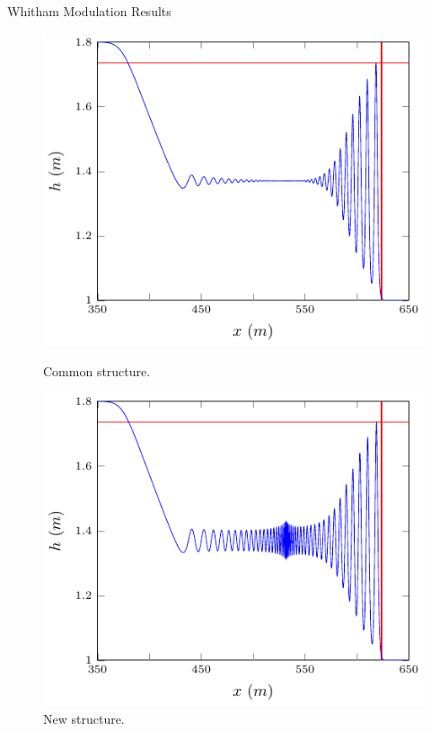 \documentclass[pdf]{beamer}
\begin{document}
\begin{frame}{Whitham Modulation Results}
		\begin{figure}
			\hspace*{-0.9cm}%
			\begin{minipage}{.5\textwidth}
				\includegraphics[width=1.2\linewidth]{./Pictures/DSW/DSWap.pdf}
				\caption{Common structure.}
			\end{minipage}%
			\hspace*{0.9cm}%
			\begin{minipage}{.5\textwidth}
				\includegraphics[width=1.2\linewidth]{./Pictures/DSW/DSWap1.pdf}
				\caption{New structure.}
			\end{minipage}
		\end{figure}
\end{frame}
\end{document}
